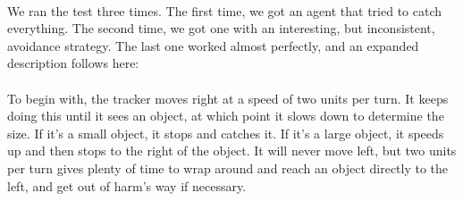 \documentclass[a4paper,12pt]{article}
\begin{document}
\paragraph{}We ran the test three times. The first time, we got an agent that tried to catch everything. The second time, we got one with an interesting, but inconsistent, avoidance strategy. The last one worked almost perfectly, and an expanded description follows here:
\paragraph{}To begin with, the tracker moves right at a speed of two units per turn. It keeps doing this until it sees an object, at which point it slows down to determine the size. If it's a small object, it stops and catches it. If it's a large object, it speeds up and then stops to the right of the object. It will never move left, but two units per turn gives plenty of time to wrap around and reach an object directly to the left, and get out of harm's way if necessary.
\end{document}
